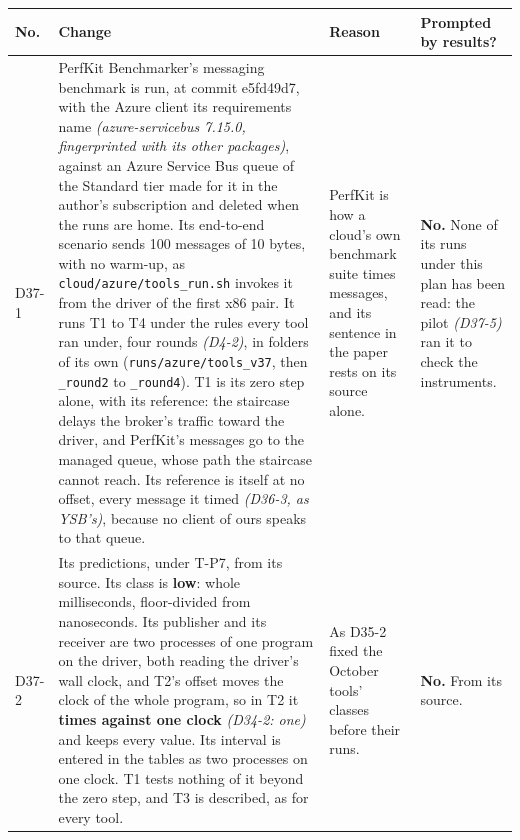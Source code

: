 \documentclass[11pt]{article}
\newcommand{\gl}[1]{{\color{soft}\itshape\small (#1)}}
\begin{document}
{\small
\begin{longtable}{@{}p{1.1cm} >{\raggedright\arraybackslash}p{6.1cm} >{\raggedright\arraybackslash}p{6.0cm} >{\raggedright\arraybackslash}p{2.2cm}@{}}
\toprule
\textbf{No.} & \textbf{Change} & \textbf{Reason} & \textbf{Prompted by results?} \\
\midrule
\endhead
D37-1 & PerfKit Benchmarker's messaging benchmark is run, at commit e5fd49d7, with the Azure client its requirements name \gl{azure-servicebus 7.15.0, fingerprinted with its other packages}, against an Azure Service Bus queue of the Standard tier made for it in the author's subscription and deleted when the runs are home. Its end-to-end scenario sends 100 messages of 10 bytes, with no warm-up, as \texttt{cloud/azure/tools\_run.sh} invokes it from the driver of the first x86 pair. It runs T1 to T4 under the rules every tool ran under, four rounds \gl{D4-2}, in folders of its own (\texttt{runs/azure/tools\_v37}, then \texttt{\_round2} to \texttt{\_round4}). T1 is its zero step alone, with its reference: the staircase delays the broker's traffic toward the driver, and PerfKit's messages go to the managed queue, whose path the staircase cannot reach. Its reference is itself at no offset, every message it timed \gl{D36-3, as YSB's}, because no client of ours speaks to that queue. & PerfKit is how a cloud's own benchmark suite times messages, and its sentence in the paper rests on its source alone. & \textbf{No.} None of its runs under this plan has been read: the pilot \gl{D37-5} ran it to check the instruments. \\
D37-2 & Its predictions, under T-P7, from its source. Its class is \textbf{low}: whole milliseconds, floor-divided from nanoseconds. Its publisher and its receiver are two processes of one program on the driver, both reading the driver's wall clock, and T2's offset moves the clock of the whole program, so in T2 it \textbf{times against one clock} \gl{D34-2: one} and keeps every value. Its interval is entered in the tables as two processes on one clock. T1 tests nothing of it beyond the zero step, and T3 is described, as for every tool. & As D35-2 fixed the October tools' classes before their runs. & \textbf{No.} From its source. \\

\end{longtable}}
\end{document}
